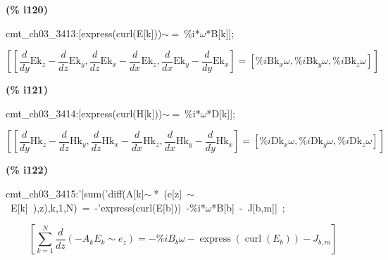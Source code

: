 \documentclass[fleqn]{article}
\begin{document}
\noindent
\begin{minipage}[t]{4.000000em}\color{red}\bfseries
(\% i120)	
\end{minipage}
\begin{minipage}[t]{\textwidth}\color{blue}
cmt\_ch03\_3413:[express(curl(E[k]))\ensuremath{\sim\ }=\ \%i*\ensuremath{\omega}*B[k]];
\end{minipage}
\[\displaystyle \tag{cmt\_ ch03\_ 3413} 
\left[ \left[ \frac{d}{d y} {{\ensuremath{\mathrm{Ek}}}_z}-\frac{d}{d z} {{\ensuremath{\mathrm{Ek}}}_y}\operatorname{,}\frac{d}{d z} {{\ensuremath{\mathrm{Ek}}}_x}-\frac{d}{d x} {{\ensuremath{\mathrm{Ek}}}_z}\operatorname{,}\frac{d}{d x} {{\ensuremath{\mathrm{Ek}}}_y}-\frac{d}{d y} {{\ensuremath{\mathrm{Ek}}}_x}\right] =\left[ \% i {{\ensuremath{\mathrm{Bk}}}_x} \omega \operatorname{,}\% i {{\ensuremath{\mathrm{Bk}}}_y} \omega \operatorname{,}\% i {{\ensuremath{\mathrm{Bk}}}_z} \omega \right] \right] \mbox{}
\]


\noindent
\begin{minipage}[t]{4.000000em}\color{red}\bfseries
(\% i121)	
\end{minipage}
\begin{minipage}[t]{\textwidth}\color{blue}
cmt\_ch03\_3414:[express(curl(H[k]))\ensuremath{\sim\ }=\ \%i*\ensuremath{\omega}*D[k]];
\end{minipage}
\[\displaystyle \tag{cmt\_ ch03\_ 3414} 
\left[ \left[ \frac{d}{d y} {{\ensuremath{\mathrm{Hk}}}_z}-\frac{d}{d z} {{\ensuremath{\mathrm{Hk}}}_y}\operatorname{,}\frac{d}{d z} {{\ensuremath{\mathrm{Hk}}}_x}-\frac{d}{d x} {{\ensuremath{\mathrm{Hk}}}_z}\operatorname{,}\frac{d}{d x} {{\ensuremath{\mathrm{Hk}}}_y}-\frac{d}{d y} {{\ensuremath{\mathrm{Hk}}}_x}\right] =\left[ \% i {{\ensuremath{\mathrm{Dk}}}_x} \omega \operatorname{,}\% i {{\ensuremath{\mathrm{Dk}}}_y} \omega \operatorname{,}\% i {{\ensuremath{\mathrm{Dk}}}_z} \omega \right] \right] \mbox{}
\]


\noindent
\begin{minipage}[t]{4.000000em}\color{red}\bfseries
(\% i122)	
\end{minipage}
\begin{minipage}[t]{\textwidth}\color{blue}
cmt\_ch03\_3415:'[sum('diff(A[k]\ensuremath{\sim\ }*\ (e[z]\ \ensuremath{\sim\ }\ E[k]\ ),z),k,1,N)\ =\ -'express(curl(E[b]))\ -\%i*\ensuremath{\omega}*B[b]\ -\ J[b,m]]\ ;
\end{minipage}
\[\displaystyle \tag{cmt\_ ch03\_ 3415} 
\left[ \sum_{k=1}^{N}{\left. \frac{d}{d z} \left( -{A_k} {E_k}\operatorname{\sim  }{e_z}\right) \right.}=-\% i {B_b} \omega -\operatorname{express}\left( \operatorname{curl}\left( {E_b}\right) \right) -{J_{b,m}}\right] \mbox{}
\]
\end{document}
